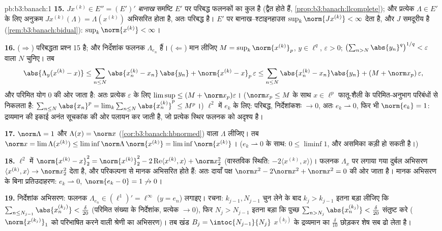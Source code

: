 \begin{solution}{pb:b3:banach:1}
\textbf{15.} $J x^{(k)} \in E'' = (E')'$ \emph{बानाख} समष्टि $E'$ पर परिबद्ध फलनकों का
कुल है (द्वैत  होते हैं, \cref{prop:b3:banach:llcomplete}); और प्रत्येक $\Lambda \in E'$ के लिए
अनुक्रम $Jx^{(k)}(\Lambda) =
\Lambda(x^{(k)})$ अभिसरित होता है, अतः परिबद्ध है। $E'$ पर बानाख--श्टाइनहाउस
$\sup_k\norm{Jx^{(k)}} <
\infty$ देता है, और $J$ समदूरीय है (\cref{rem:b3:banach:bidual}): $\sup_k\norm{x^{(k)}} <
\infty$।

\textbf{16.} ($\Rightarrow$) परिबद्धता प्रश्न 15 है; और निर्देशांक फलनक
$\Lambda_{e_n}$ हैं। ($\Leftarrow$) मान लीजिए $M = \sup_k\norm{x^{(k)}}_p$, $y \in
\ell^q$, $\varepsilon > 0$; $\bigl(\sum_{n>N}\abs{y_n}^q\bigr)^{1/q} < \varepsilon$ वाला $N$
चुनिए। तब
\[
\abs{\Lambda_y(x^{(k)} - x)} \leq
\sum_{n\leq N}\abs{x^{(k)}_n - x_n}\,\abs{y_n} +
\norm{x^{(k)} - x}_p\,\varepsilon
\leq \sum_{n\leq N}\abs{x^{(k)}_n - x_n}\abs{y_n} +
(M + \norm x_p)\,\varepsilon,
\]
और परिमित योग $0$ की ओर जाता है: अतः प्रत्येक $\varepsilon$ के लिए $\limsup \leq (M + \norm
x_p)\varepsilon$।
($\norm x_p \leq M$ के साथ $x \in
\ell^p$ फातू-शैली के परिमित-अनुभाग परिबंधों से निकलता
है: $\sum_{n \leq N}\abs{x_n}^p =
\lim_k\sum_{n\leq N}\abs{x^{(k)}_n}^p \leq M^p$।) $\ell^2$ में $e_k$ के लिए: परिबद्ध, निर्देशांकशः $\to 0$,
अतः $e_k
\rightharpoonup 0$, फिर भी $\norm{e_k} = 1$: द्रव्यमान की इकाई अनंत सूचकांक की ओर पलायन
कर जाती है, जो प्रत्येक स्थिर फलनक को अदृश्य है।

\textbf{17.} $\norm\Lambda = 1$ और $\Lambda(x) = \norm x$ (\cref{cor:b3:banach:hbnormed}) वाला $\Lambda$ लीजिए। तब $\norm x = \lim\Lambda(x^{(k)}) \leq
\liminf\norm\Lambda\,\norm{x^{(k)}} =
\liminf\norm{x^{(k)}}$।
($e_k \rightharpoonup 0$ के साथ: $0
\leq \liminf 1$, और असमिका कड़ी हो सकती है।)

\textbf{18.} $\ell^2$ में $\norm{x^{(k)} - x}_2^2 =
\norm{x^{(k)}}_2^2 - 2\operatorname{Re}\langle x^{(k)},
x\rangle + \norm x_2^2$ (वास्तविक स्थिति: $-2\langle x^{(k)},
x\rangle$)। फलनक $\Lambda_x$
पर लगाया गया दुर्बल अभिसरण $\langle x^{(k)}, x\rangle \to \norm
x_2^2$ देता है, और परिकल्पना से मानक
अभिसरित होते हैं: अतः दायाँ पक्ष $\norm x^2 - 2\norm x^2 + \norm x^2 = 0$ की ओर जाता है। मानक अभिसरण
के बिना प्रतिउदाहरण: $e_k
\rightharpoonup 0$, $\norm{e_k - 0} = 1 \not\to 0$।

\textbf{19.} निर्देशांक अभिसरण: फलनक $\Lambda_{e_n} \in (\ell^1)' = \ell^\infty$ ($y = e_n$) लगाइए। रचना:
$k_{j-1}, N_{j-1}$ चुन लेने के बाद $k_j >
k_{j-1}$ इतना बड़ा लीजिए कि $\sum_{n \leq
N_{j-1}}\abs{x^{(k_j)}_n} < \frac\delta{20}$ (परिमित संख्या
के निर्देशांक, प्रत्येक $\to 0$), फिर $N_j > N_{j-1}$ इतना बड़ा कि पुच्छ $\sum_{n > N_j}\abs{x^{(k_j)}_n} <
\frac\delta{20}$
संतुष्ट करे ($\norm{x^{(k_j)}}_1$ को परिभाषित करने वाली श्रेणी का अभिसरण)। तब खंड
$B_j = \intoc{N_{j-1}}{N_j}$ $x^{(k_j)}$ के द्रव्यमान का $\frac\delta{10}$ छोड़कर शेष सब ढो लेता है।


\end{solution}
